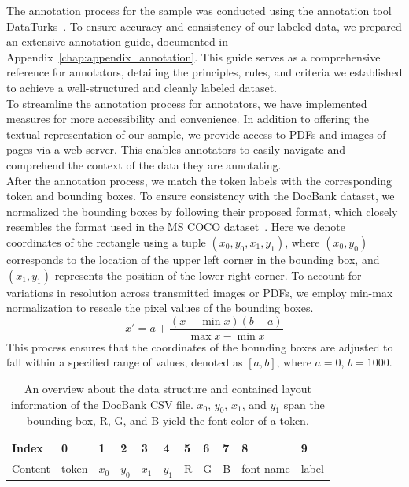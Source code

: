 The annotation process for the sample was conducted using the annotation tool DataTurks~\cite{dataturks}. To ensure accuracy and consistency of our labeled data, we prepared an extensive annotation guide, documented in Appendix~\ref{chap:appendix_annotation}. This guide serves as a comprehensive reference for annotators, detailing the principles, rules, and criteria we established to achieve a well-structured and cleanly labeled dataset.\\
To streamline the annotation process for annotators, we have implemented measures for more accessibility and convenience. In addition to offering the textual representation of our sample, we provide access to PDFs and images of pages via a web server. This enables annotators to easily navigate and comprehend the context of the data they are annotating.\\

After the annotation process, we match the token labels with the corresponding token and bounding boxes. To ensure consistency with the DocBank dataset, we normalized the bounding boxes by following their proposed format, which closely resembles the format used in the MS COCO dataset~\cite{lin2014microsoft}. Here we denote coordinates of the rectangle using a tuple $(x_0, y_0, x_1, y_1)$, where $(x_0, y_0)$ corresponds to the location of the upper left corner in the bounding box, and $(x_1, y_1)$ represents the position of the lower right corner. To account for variations in resolution across transmitted images or PDFs, we employ min-max normalization to rescale the pixel values of the bounding boxes.
\begin{equation}
    x' = a + \frac{(x - \min{x})(b - a)}{\max{x} - \min{x}}
\end{equation}
This process ensures that the coordinates of the bounding boxes are adjusted to fall within a specified range of values, denoted as $[a, b]$, where $a = 0$, $b = 1000$.

\begin{table}[!ht]
	\centering
	\begin{tabular}{l|l|l|l|l|l|l|l|l|l|l}
        \textbf{Index} & \textbf{0} & \textbf{1} & \textbf{2} & \textbf{3} & \textbf{4} & \textbf{5} & \textbf{6} & \textbf{7} & \textbf{8} & \textbf{9} \\ \hline
        Content & token & $x_0$ & $y_0$ & $x_1$ & $y_1$ & R & G & B & font name & label
    \end{tabular}
	\caption{An overview about the data structure and contained layout information of the DocBank CSV file. $x_0$, $y_0$, $x_1$, and $y_1$ span the bounding box, R, G, and B yield the font color of a token.}
	\label{tab:docbank_data}
\end{table}

